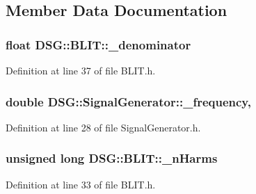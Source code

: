\subsection{Member Data Documentation}
\hypertarget{classDSG_1_1BLIT_a664b4f06a7b5657261cfaa30dd503c16}{
\subsubsection[{\+\_\+denominator}]{\setlength{\rightskip}{0pt plus 5cm}float D\+S\+G\+::\+B\+L\+I\+T\+::\+\_\+denominator\hspace{0.3cm}{\ttfamily [protected]}}}\label{classDSG_1_1BLIT_a664b4f06a7b5657261cfaa30dd503c16}


Definition at line 37 of file B\+L\+I\+T.\+h.

\hypertarget{classDSG_1_1SignalGenerator_a67e296e3506dcdf09402c667cddff9ac}{
\subsubsection[{\+\_\+frequency}]{\setlength{\rightskip}{0pt plus 5cm}double D\+S\+G\+::\+Signal\+Generator\+::\+\_\+frequency\hspace{0.3cm}{\ttfamily [protected]}, {\ttfamily [inherited]}}}\label{classDSG_1_1SignalGenerator_a67e296e3506dcdf09402c667cddff9ac}


Definition at line 28 of file Signal\+Generator.\+h.

\hypertarget{classDSG_1_1BLIT_afe749d26f1503740bedd54f5147bc66d}{
\subsubsection[{\+\_\+n\+Harms}]{\setlength{\rightskip}{0pt plus 5cm}unsigned long D\+S\+G\+::\+B\+L\+I\+T\+::\+\_\+n\+Harms\hspace{0.3cm}{\ttfamily [protected]}}}\label{classDSG_1_1BLIT_afe749d26f1503740bedd54f5147bc66d}


Definition at line 33 of file B\+L\+I\+T.\+h.

